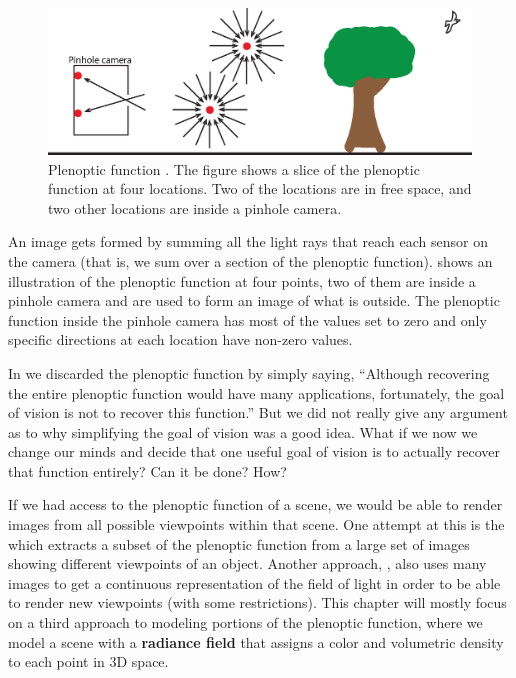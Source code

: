 \begin{figure}[t]
    \centerline{
        \includegraphics[width=1\linewidth]{figures/nerfs/plenoptic_function.eps}
    }
    \caption{Plenoptic function \cite{Adelson91}.
        The figure shows a slice of the plenoptic function at four locations. Two of the locations are in free space, and two other locations are inside a pinhole camera.}
    \label{fig:nerfs:plenoptic_function}
\end{figure}


An image gets formed by summing all the light rays that reach each sensor on the camera (that is, we sum over a section of the plenoptic function).  \Fig{\ref{fig:nerfs:plenoptic_function}} shows an illustration of the plenoptic function at four points, two of them are inside a pinhole camera and are used to form an image of what is outside. The plenoptic function inside the pinhole camera has most of the values set to zero and only specific directions at each location have non-zero values.

In \chap{\ref{chap:challenge_of_vision}} we discarded the plenoptic function by simply saying, ``Although recovering the entire plenoptic function would have many applications, fortunately, the goal of vision is not to recover this function.'' But we did not really give any argument as to why simplifying the goal of vision was a good idea. What if we now we change our minds and decide that one useful goal of vision is to actually recover that function entirely? Can it be done? How?

If we had access to the plenoptic function of a scene, we would be able to render images from all possible viewpoints within that scene. One attempt at this is the  \cite{Gortler1996} which extracts a subset of the plenoptic function from a large set of images showing different viewpoints of an object. Another approach,  \cite{Levoy1996}, also uses many images to get a continuous representation of the field of light in order to be able to render new viewpoints (with some restrictions). This chapter will mostly focus on a third approach to modeling portions of the plenoptic function, where we model a scene with a \textbf{radiance field} that assigns a color and volumetric density to each point in 3D space.

